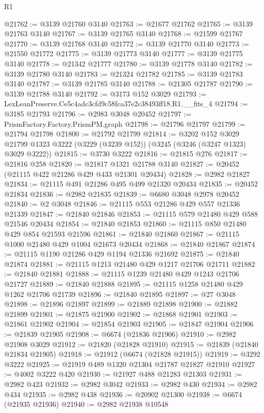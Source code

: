 \begin{lexlean}{R1}
\begin{coremodule}
@21762 := @3139 @21760 @3140
@21763 := @21677 @21762
@21765 := @3139 @21763 @3140
@21767 := @3139 @21765 @3140
@21768 := @21599 @21767
@21770 := @3139 @21768 @3140
@21772 := @3139 @21770 @3140
@21773 := @21550 @21772
@21775 := @3139 @21773 @3140
@21777 := @3139 @21775 @3140
@21778 := @21342 @21777
@21780 := @3139 @21778 @3140
@21782 := @3139 @21780 @3140
@21783 := @21324 @21782
@21785 := @3139 @21783 @3140
@21787 := @3139 @21785 @3140
@21788 := @21305 @21787
@21790 := @3139 @21788 @3140
@21792 := @3173 @152 @3029
@21793 := LexLeanPreserve.Ce5c4adc3cfd9c58fca37e2c38493ff18.R1.__fits_4
@21794 := @3185 @21793
@21796 := @2983 @3048 @20452
@21797 := PrismFactory.Factory.PrismPM.graph
@21798 := @21796 @21797
@21799 := @21794 @21798
@21800 := @21792 @21799
@21814 := @3202
    @152
    @3029
    @21799
    @1323
    @3222
    (@3229 (@3239 @152))
    (@3245 (@3246 (@3247 @1323) @3029 @3222))
@21815 := @3730 @3222
@21816 := @21815 @276
@21817 := @21816 @258
@21820 := @21817 @1321 @21788 @3140
@21827 := @20452 (@21115 @422 @21286 @429 @433 @21301 @20434)
@21828 := @2982 @21827
@21834 := @21115 @491 @21286 @495 @499 @21320 @20434
@21835 := @20452 @21834
@21836 := @2982 @21835
@21839 := @6680 @3048 @2978 @20452
@21840 := @2 @3048
@21846 := @21115 @553 @21286 @429 @557 @21336 @21339
@21847 := @21840 @21846
@21853 := @21115 @579 @21480 @429 @588 @21546 @20434
@21854 := @21840 @21853
@21860 := @21115 @850 @21480 @429 @854 @21593 @21596
@21861 := @21840 @21860
@21867 := @21115 @1000 @21480 @429 @1004 @21673 @20434
@21868 := @21840 @21867
@21874 := @21115 @1190 @21286 @429 @1194 @21336 @21692
@21875 := @21840 @21874
@21881 := @21115 @1213 @21480 @429 @1217 @21706 @21711
@21882 := @21840 @21881
@21888 := @21115 @1239 @21480 @429 @1243 @21706 @21727
@21889 := @21840 @21888
@21895 := @21115 @1258 @21480 @429 @1262 @21706 @21739
@21896 := @21840 @21895
@21897 := @27 @3048
@21898 := @21896 @21897
@21899 := @21889 @21898
@21900 := @21882 @21899
@21901 := @21875 @21900
@21902 := @21868 @21901
@21903 := @21861 @21902
@21904 := @21854 @21903
@21905 := @21847 @21904
@21906 := @21839 @21905
@21908 := @6674 (@21836 @21906)
@21910 := @2982 @21908 @3029
@21912 := @21820 (@21828 @21910)
@21915 := @21839 (@21840 @21834 @21905)
@21918 := @21912 (@6674 (@21828 @21915))
@21919 := @3292 @3222
@21925 := @21919 @489 @1320 @21304 @21787 @21827 @21910
@21927 := @4002 @3222 @420
@21930 := @21927 @488 @21283 @21303
@21931 := @2982 @423
@21932 := @2982 @3042
@21933 := @2982 @430
@21934 := @2982 @434
@21935 := @2982 @438
@21936 := @20902 @21300
@21938 := @6674 (@21935 @21936)
@21940 := @2982 @21938 @10548

\end{coremodule}
\end{lexlean}
